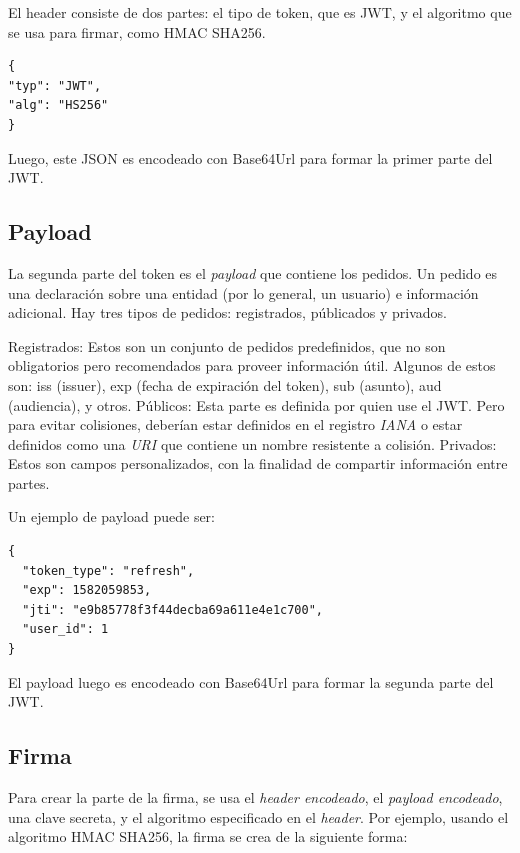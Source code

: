 El header consiste de dos partes: el tipo de token, que es JWT, y el algoritmo que se usa para firmar, como HMAC SHA256.

\begin{verbatim}
{
"typ": "JWT",
"alg": "HS256"
}
\end{verbatim}
Luego, este JSON es encodeado con Base64Url para formar la primer parte del JWT.

\subsection[Payload]{Payload}

La segunda parte del token es el \textit{payload} que contiene los pedidos. Un pedido es una declaración sobre una entidad (por lo general, un usuario) e información adicional. Hay tres tipos de pedidos: registrados, públicados y privados.

\begin{outline}
    \1 Registrados: Estos son un conjunto de pedidos predefinidos, que no son obligatorios pero recomendados para proveer información útil. Algunos de estos son: iss (issuer), exp (fecha de expiración del token), sub (asunto), aud (audiencia), y otros.
    \1 Públicos: Esta parte es definida por quien use el JWT. Pero para evitar colisiones, deberían estar definidos en el registro \textit{IANA} o estar definidos como una \textit{URI} que contiene un nombre resistente a colisión.
    \1 Privados: Estos son campos personalizados, con la finalidad de compartir información entre partes.
\end{outline}

Un ejemplo de payload puede ser: 

\begin{verbatim}
{
  "token_type": "refresh",
  "exp": 1582059853,
  "jti": "e9b85778f3f44decba69a611e4e1c700",
  "user_id": 1
}
\end{verbatim}

El payload luego es encodeado con Base64Url para formar la segunda parte del JWT.

\subsection[Firma]{Firma}

Para crear la parte de la firma, se usa el \textit{header encodeado}, el \textit{payload encodeado}, una clave secreta, y el algoritmo especificado en el \textit{header}.
Por ejemplo, usando el algoritmo HMAC SHA256, la firma se crea de la siguiente forma: 

